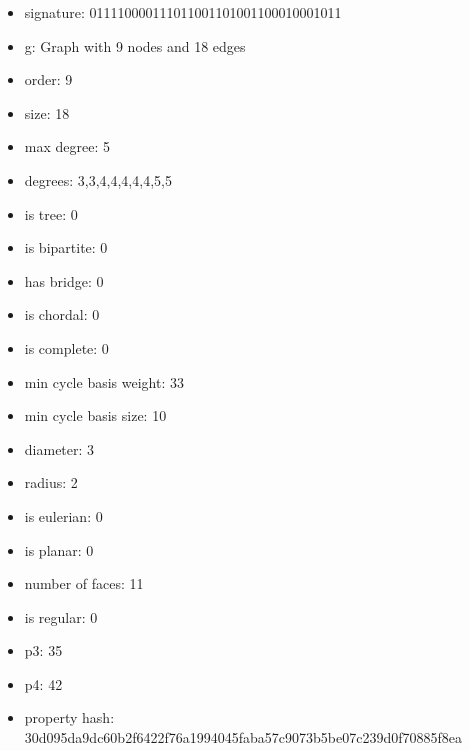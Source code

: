 \newpage
\begin{figure}
\end{figure}
\begin{itemize}
\item signature: 011110000111011001101001100010001011
\item g: Graph with 9 nodes and 18 edges
\item order: 9
\item size: 18
\item max degree: 5
\item degrees: 3,3,4,4,4,4,4,5,5
\item is tree: 0
\item is bipartite: 0
\item has bridge: 0
\item is chordal: 0
\item is complete: 0
\item min cycle basis weight: 33
\item min cycle basis size: 10
\item diameter: 3
\item radius: 2
\item is eulerian: 0
\item is planar: 0
\item number of faces: 11
\item is regular: 0
\item p3: 35
\item p4: 42
\item property hash: 30d095da9dc60b2f6422f76a1994045faba57c9073b5be07c239d0f70885f8ea
\end{itemize}

